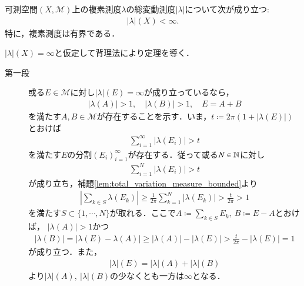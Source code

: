 	\begin{screen}
		\begin{thm}[総変動は有限]\label{thm:total_variation_measure_bounded}
			可測空間$(X,\mathcal{M})$上の複素測度$\lambda$の総変動測度$|\lambda|$について次が成り立つ:
			\begin{align}
				|\lambda|(X) < \infty.
			\end{align}
			特に，複素測度は有界である．
		\end{thm}
	\end{screen}

	\begin{prf} $|\lambda|(X) = \infty$と仮定して背理法により定理を導く．
		\begin{description}
		\item[第一段]
			或る$E \in \mathcal{M}$に対し$|\lambda|(E) = \infty$が成り立っているなら，
			\begin{align}
				|\lambda(A)| > 1, \quad |\lambda(B)| > 1, \quad E = A + B
			\end{align}
			を満たす$A,B \in \mathcal{M}$が存在することを示す．いま，$t \coloneqq 2\pi(1 + |\lambda(E)|)$とおけば
			\begin{align}
				\sum_{i=1}^{\infty} |\lambda(E_i)| > t
			\end{align}
			を満たす$E$の分割$(E_i)_{i=1}^{\infty}$が存在する．従って或る$N \in \mathbb{N}$に対し
			\begin{align}
				\sum_{i=1}^{N} |\lambda(E_i)| > t
			\end{align}
			が成り立ち，補題\ref{lem:total_variation_measure_bounded}より
			\begin{align}
				\left| \sum_{k \in S} \lambda(E_k) \right| \geq \frac{1}{2\pi} \sum_{k=1}^{N} |\lambda(E_k)| > \frac{t}{2\pi} > 1
			\end{align}
			を満たす$S \subset \{1,\cdots,N\}$が取れる．ここで$A \coloneqq \sum_{k \in S} E_k,\ B \coloneqq E - A$とおけば，
			$|\lambda(A)| > 1$かつ
			\begin{align}
				|\lambda(B)| = |\lambda(E)-\lambda(A)| \geq |\lambda(A)| - |\lambda(E)| > \frac{t}{2\pi} - |\lambda(E)| = 1
			\end{align}
			が成り立つ．また，
			\begin{align}
				|\lambda|(E) = |\lambda|(A) + |\lambda|(B)
			\end{align}
			より$|\lambda|(A),\ |\lambda|(B)$の少なくとも一方は$\infty$となる．
		

\end{description}
\end{prf}
